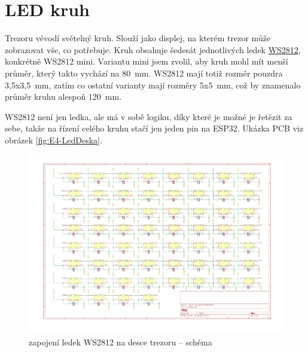 \section{LED kruh}

Trezoru vévodí světelný kruh. Slouží jako displej, na kterém trezor může zobrazovat vše, co potřebuje. Kruh obsahuje šedesát jednotlivých ledek 
\href{https://cdn-shop.adafruit.com/datasheets/WS2812B.pdf}{WS2812}, konkrétně WS2812 mini. Variantu mini jsem zvolil, aby kruh mohl mít menší
průměr, který takto vychází na 80~mm. WS2812 mají totiž rozměr pouzdra 3,5x3,5~mm, zatím co ostatní varianty mají rozměry 5x5~mm, což by znamenalo průměr kruhu alespoň 120~mm.

WS2812 není jen ledka, ale má v sobě logiku, díky které je možné je řetězit za sebe, takže na řízení celého kruhu stačí jen jeden pin na ESP32.\newline
Ukázka PCB viz obrázek \ref{fig:E4-LedDeska}.
\begin{figure}[htbp]
    \centering
    \includegraphics[width=\textwidth]{kapitoly/obrazky/E4/WS2812/zapojeni_WS2812.pdf}
    \caption{zapojení ledek WS2812 na desce trezoru -- schéma}
    \label{fig:E4-sch_civka_tercik}
\end{figure}

\newpage